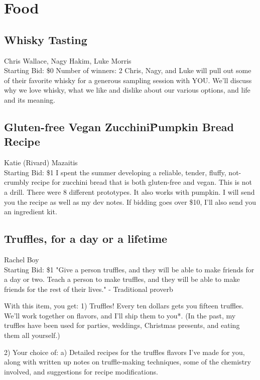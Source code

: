 \documentclass[11pt]{article}
\begin{document}
\section{Food}
\subsection{Whisky Tasting}
Chris Wallace, Nagy Hakim, Luke Morris
\\
Starting Bid: \$0
\newline
Number of winners: 2
\newline
Chris, Nagy, and Luke will pull out some of their favorite whisky for a generous sampling session with YOU. We'll discuss why we love whisky, what we like and dislike about our various options, and life and its meaning.
\subsection{Gluten-free Vegan Zucchini\^Pumpkin Bread Recipe}
Katie (Rivard) Mazaitis
\\
Starting Bid: \$1
\newline
I spent the summer developing a reliable, tender, fluffy, not-crumbly recipe for zucchini bread that is both gluten-free and vegan. This is not a drill. There were 8 different prototypes. It also works with pumpkin. I will send you the recipe as well as my dev notes. If bidding goes over \$10, I'll also send you an ingredient kit.
\subsection{Truffles, for a day or a lifetime}
Rachel Boy
\\
Starting Bid: \$1
\newline
"Give a person truffles, and they will be able to make friends for a day or two. Teach a person to make truffles, and they will be able to make friends for the rest of their lives."
- Traditional proverb

With this item, you get:
1) Truffles! Every ten dollars gets you fifteen truffles. We'll work together on flavors, and I'll ship them to you*. (In the past, my truffles have been used for parties, weddings, Christmas presents, and eating them all yourself.)

2) Your choice of:
    a) Detailed recipes for the truffles flavors I've made for you, along with written up notes on truffle-making techniques, some of the chemistry involved, and suggestions for recipe modifications.
\end{document}
